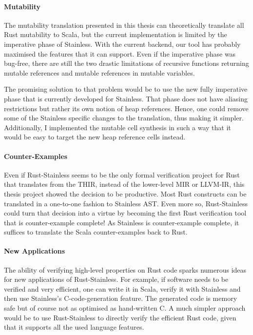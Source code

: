 \paragraph{Mutability}

The mutability translation presented in this thesis can theoretically translate
all Rust mutability to Scala, but the current implementation is limited by the
imperative phase of Stainless. With the current backend, our tool has probably
maximised the features that it can support. Even if the imperative phase was
bug-free, there are still the two drastic limitations of recursive functions
returning mutable references and mutable references in mutable variables.

The promising solution to that problem would be to use the new fully imperative
phase that is currently developed for Stainless. That phase does not have
aliasing restrictions but rather its own notion of heap references. Hence, one
could remove some of the Stainless specific changes to the translation, thus
making it simpler.  Additionally, I implemented the mutable cell synthesis in
such a way that it would be easy to target the new heap reference cells instead.


\paragraph{Counter-Examples}

Even if Rust-Stainless seems to be the only formal verification project for Rust
that translates from the THIR, instead of the lower-level MIR or LLVM-IR, this
thesis project showed the decision to be productive. Most Rust constructs can be
translated in a one-to-one fashion to Stainless AST. Even more so,
Rust-Stainless could turn  that decision into a virtue by becoming the first
Rust verification tool that is counter-example complete! As Stainless is
counter-example complete, it suffices to translate the Scala counter-examples
back to Rust.



\paragraph{New Applications}

The ability of verifying high-level properties on Rust code sparks numerous
ideas for new applications of Rust-Stainless. For example, if software needs to
be verified and very efficient, one can write it in Scala, verify it with
Stainless and then use Stainless's C-code-generation feature. The generated code
is memory safe but of course not as optimised as hand-written C. A much simpler
approach would be to use Rust-Stainless  to directly verify the efficient Rust
code, given that it supports all the used language features.

